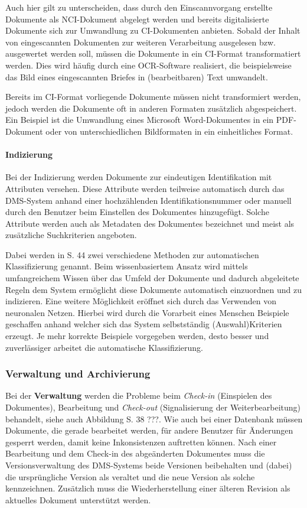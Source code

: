 Auch hier gilt zu unterscheiden, dass durch den Einscannvorgang erstellte Dokumente als \gls{NCI}-Dokument abgelegt werden und bereits digitalisierte Dokumente sich zur Umwandlung zu \gls{CI}-Dokumenten anbieten.
Sobald der Inhalt von eingescannten Dokumenten zur weiteren Verarbeitung ausgelesen bzw. ausgewertet werden soll, müssen die Dokumente in ein \gls{CI}-Format transformatiert werden.
Dies wird häufig durch eine \gls{OCR}-Software realisiert, die beispielsweise das Bild eines eingescannten Briefes in (bearbeitbaren) Text umwandelt.

Bereits im \gls{CI}-Format vorliegende Dokumente müssen nicht transformiert werden, jedoch werden die Dokumente oft in anderen Formaten zusätzlich abgespeichert.
Ein Beispiel ist die Umwandlung eines Microsoft Word-Dokumentes in ein \gls{PDF}-Dokument oder von unterschiedlichen Bildformaten in ein einheitliches Format.

\paragraph{Indizierung}
Bei der Indizierung werden Dokumente zur eindeutigen Identifikation mit Attributen versehen.
Diese Attribute werden teilweise automatisch durch das DMS-System anhand einer hochzählenden Identifikationsnummer oder manuell durch den Benutzer beim Einstellen des Dokumentes hinzugefügt.
Solche Attribute werden auch als Metadaten des Dokumentes bezeichnet und meist als zusätzliche Suchkriterien angeboten.

Dabei werden in \cite{DMS08} S. 44 zwei verschiedene Methoden zur automatischen Klassifizierung genannt.
Beim wissenbasiertem Ansatz wird mittels umfangreichem Wissen über das Umfeld der Dokumente und dadurch abgeleitete Regeln dem System ermöglicht diese Dokumente automatisch einzuordnen und zu indizieren.
Eine weitere Möglichkeit eröffnet sich durch das Verwenden von neuronalen Netzen.
Hierbei wird durch die Vorarbeit eines Menschen Beispiele geschaffen anhand welcher sich das System selbstständig (Auswahl)Kriterien erzeugt.
Je mehr korrekte Beispiele vorgegeben werden, desto besser und zuverlässiger arbeitet die automatische Klassifizierung.

\subsubsection{Verwaltung und Archivierung}
Bei der \textbf{Verwaltung} werden die Probleme beim \textit{Check-in} (Einspielen des Dokumentes), Bearbeitung und \textit{Check-out} (Signalisierung der Weiterbearbeitung) behandelt, siehe auch Abbildung \cite{DMS08} S. 38 ???.
Wie auch bei einer Datenbank müssen Dokumente, die gerade bearbeitet werden, für andere Benutzer für Änderungen gesperrt werden, damit keine Inkonsistenzen auftretten können.
Nach einer Bearbeitung und dem Check-in des abgeänderten Dokumentes muss die Versionsverwaltung des \gls{DMS}-Systems beide Versionen beibehalten und (dabei) die ursprüngliche Version als veraltet und die neue Version als solche kennzeichnen.
Zusätzlich muss die Wiederherstellung einer älteren Revision als aktuelles Dokument unterstützt werden.


